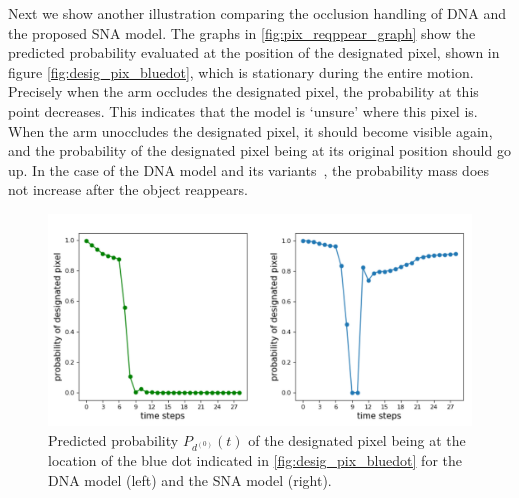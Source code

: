 Next we show another illustration comparing the occlusion handling of DNA and the proposed SNA model. The graphs in \autoref{fig:pix_reqppear_graph} show the predicted probability evaluated at the position of the designated pixel, shown in figure \ref{fig:desig_pix_bluedot}, which is stationary during the entire motion. Precisely when the arm occludes the designated pixel, the probability at this point decreases. This indicates that the model is `unsure' where this pixel is. When the arm unoccludes the designated pixel, it should become visible again, and the probability of the designated pixel being at its original position should go up. In the case of the DNA model and its variants~\cite{finn_nips}, the probability mass does not increase after the object reappears. 
 
 \begin{figure}[t]
 	\centering
 	\includegraphics[width=0.9\columnwidth]{images_sna/occlusionaware/probability_curves.pdf}
 	\caption{Predicted probability $P_{d^{(0)}}(t)$ of the designated pixel being at the location of the blue dot indicated in \autoref{fig:desig_pix_bluedot} for the DNA model (left) and the SNA model (right). }      \label{fig:pix_reqppear_graph}
 \end{figure}

